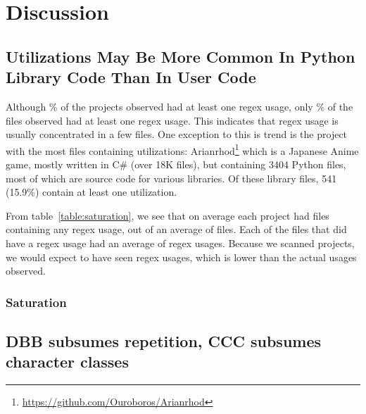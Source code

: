 \section{Discussion}
\label{sec:discussion}

\subsection{Utilizations May Be More Common In Python Library Code Than In User Code}

Although \% of the projects observed had at least one regex usage, only \% of the files observed had at least one regex usage.  This indicates that regex usage is usually concentrated in a few files.  One exception to this is trend is the project with the most files containing utilizations: Arianrhod\footnote{\url{https://github.com/Ouroboros/Arianrhod}} which is a Japanese Anime game, mostly written in C\# (over 18K files), but containing 3404 Python files, most of which are source code for various libraries.  Of these library files, 541 (15.9\%) contain at least one utilization.



From table~\ref{table:saturation}, we see that on average each project had  files containing any regex usage, out of an average of  files.  Each of the files that did have a regex usage had an average of  regex usages.  Because we scanned  projects, we would expect to have seen  regex usages, which is lower than the actual  usages observed.
\subsubsection{Saturation}



\subsection{DBB subsumes repetition, CCC subsumes character classes}

